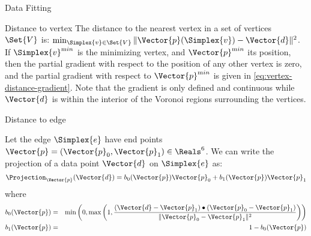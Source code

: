 \begin{plSection}{Data Fitting}
\begin{plSection}{Distance to vertex}
The distance to the nearest vertex in a set of vertices $\Set{V}$ is:
$\min_{\Simplex{v} \in \Set{V}} 
\| \Vector{p}(\Simplex{v}) - \Vector{d} \|^2$.
If $\Simplex{v}^{\mathrm min}$ is the minimizing vertex,
and
$\Vector{p}^{\mathrm min}$ its position,
then the partial gradient with respect
to the position of any other vertex is zero,
and the partial gradient with respect to $\Vector{p}^{\mathrm min}$
is given in \cref{eq:vertex-distance-gradient}.
Note that the gradient is only defined and continuous
while $\Vector{d}$ is within the interior of the
Voronoi regions surrounding the vertices.

\end{plSection}%
\begin{plSection}{Distance to edge}
\label{sec:Distance-to-edge}

Let the edge $\Simplex{e}$ have end points 
$\Vector{p} = (\Vector{p}_0, \Vector{p}_1) \in \Reals^6$.
We can write the projection of a data point 
$\Vector{d}$ on $\Simplex{e}$ as:
\begin{equation}
\Projection_\Vector{p} (\Vector{d}) 
= b_0(\Vector{p}) \Vector{p}_0 + b_1(\Vector{p}) \Vector{p}_1
\end{equation}
where
\begin{eqnarray}
b_0(\Vector{p}) & = &
\min\left(0,\max\left(1,
{{ (\Vector{d} - \Vector{p}_1) \bullet (\Vector{p}_0 - \Vector{p}_1) }
\over
{ \| \Vector{p}_0 - \Vector{p}_1 \|^2 }
}\right) \right) \\
b_1(\Vector{p}) & = & 1 - b_0(\Vector{p})
\nonumber
\end{eqnarray}


\end{plSection}
\end{plSection}

